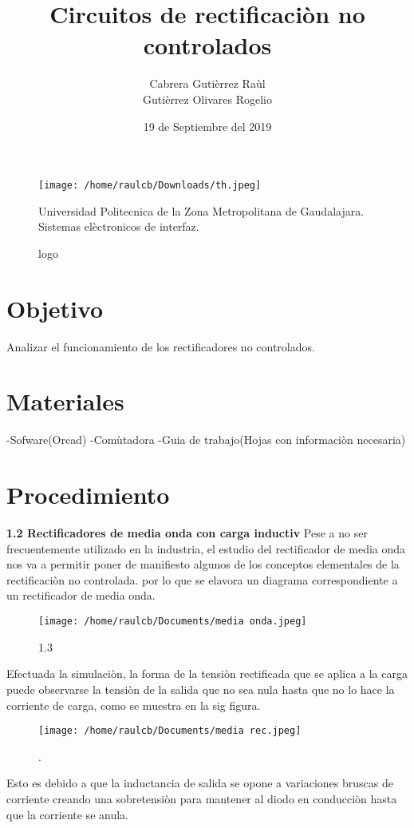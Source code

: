 \documentclass[11pt]{article}
\title{\textbf{Circuitos de rectificaciòn no controlados}}
\author{Cabrera Gutièrrez Raùl\\
		Gutièrrez Olivares Rogelio}
\date{19 de Septiembre del 2019}
\begin{document}
\begin{figure}[htp]
\centering
\texttt{[image: /home/raulcb/Downloads/th.jpeg]}
\caption{logo}
\label{logo}
Universidad Politecnica de la Zona Metropolitana de Gaudalajara.
Sistemas elèctronicos de interfaz.

\end{figure}
\maketitle 

\section{Objetivo}
Analizar el funcionamiento de los rectificadores no controlados.


\section{Materiales}
-Sofware(Orcad)
-Comùtadora
-Guia de trabajo(Hojas con informaciòn necesaria)
\section{Procedimiento}
\maketitle
\textbf{1.2 Rectificadores de media onda con carga inductiv}
Pese a no ser frecuentemente utilizado en la industria, el estudio del rectificador de media onda nos va a permitir poner de manifiesto algunos de los conceptos elementales de la rectificaciòn no controlada. 
por lo que se elavora un diagrama correspondiente a un rectificador de media onda.
\begin{figure}[htp]
\centering
\texttt{[image: /home/raulcb/Documents/media onda.jpeg]}
\caption{1.3}
\label{1.3}
\end{figure}


Efectuada la simulaciòn, la forma de la tensiòn rectificada que se aplica a la carga puede observarse la tensiòn de la salida que no sea nula hasta que no lo hace la corriente de carga, como se muestra en la sig figura.
\begin{figure}[htp]
\centering
\texttt{[image: /home/raulcb/Documents/media rec.jpeg]}
\caption{.}
\label{.}
\end{figure}

Esto es debido a que la inductancia de salida se opone a variaciones bruscas de corriente creando una sobretensiòn para mantener al diodo en conducciòn hasta que la corriente se anula.
\\
\end{document}
